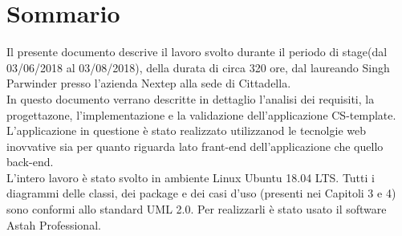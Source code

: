 
\cleardoublepage
{}
{}
\begingroup
\let\clearpage\relax
\let\cleardoublepage\relax
\let\cleardoublepage\relax

\chapter*{Sommario}
Il presente documento descrive il lavoro svolto durante il periodo di stage(dal 03/06/2018 al 03/08/2018), della durata di circa 320 ore, dal laureando Singh Parwinder presso l'azienda Nextep alla sede di Cittadella.
\\
In questo documento verrano descritte in dettaglio l'analisi dei requisiti, la progettazone, l'implementazione e la validazione dell'applicazione CS-template. L'applicazione in questione è stato realizzato utilizzanod le tecnolgie web inovvative sia per quanto riguarda lato frant-end dell'applicazione che quello back-end.\\
L'intero lavoro è stato svolto in ambiente Linux Ubuntu 18.04 LTS. Tutti i diagrammi delle classi, dei package e dei casi d’uso (presenti nei Capitoli 3 e
4) sono conformi allo standard UML 2.0. Per realizzarli è stato usato il software Astah
Professional.  

%
%

\endgroup			

\vfill

